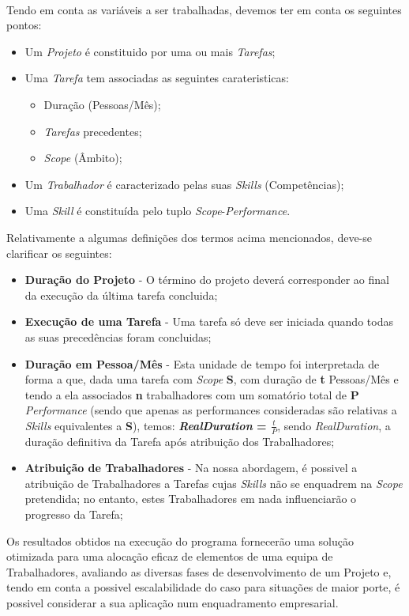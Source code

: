 \documentclass[a4paper]{article}
\begin{document}
\paragraph{}
Tendo em conta as variáveis a ser trabalhadas, devemos ter em conta os seguintes pontos:
\begin{itemize}
	\item Um \textit{Projeto} é constituido por uma ou mais \textit{Tarefas};
	\item Uma \textit{Tarefa} tem associadas as seguintes carateristicas:
	\begin{itemize}
		\item Duração (Pessoas/Mês);
		\item \textit{Tarefas} precedentes;
		\item \textit{Scope} (Âmbito);
	\end{itemize}
	\item Um \textit{Trabalhador} é caracterizado pelas suas \textit{Skills} (Competências);
	\item Uma \textit{Skill} é constituída pelo tuplo \textit{Scope}-\textit{Performance}.
\end{itemize}

Relativamente a algumas definições dos termos acima mencionados, deve-se clarificar os seguintes:
\begin{itemize}
	\item \textbf{Duração do Projeto} - O término do projeto deverá corresponder ao final da execução da última tarefa concluida;
	\item \textbf{Execução de uma Tarefa} - Uma tarefa só deve ser iniciada quando todas as suas precedências foram concluidas;
	\item \textbf{Duração em Pessoa/Mês} - Esta unidade de tempo foi interpretada de forma a que, dada uma tarefa com \textit{Scope} \textbf{S}, com duração de \textbf{t} Pessoas/Mês e tendo a ela associados \textbf{n} trabalhadores com um somatório total de \textbf{P} \textit{Performance} (sendo que apenas as performances consideradas são relativas a \textit{Skills} equivalentes a \textbf{S}), temos: \textbf{\textit{RealDuration} = $\frac{t}{P}$}, sendo \textit{RealDuration}, a duração definitiva da Tarefa após atribuição dos Trabalhadores;
	\item \textbf{Atribuição de Trabalhadores} - Na nossa abordagem, é possivel a atribuição de Trabalhadores a Tarefas cujas \textit{Skills} não se enquadrem na \textit{Scope} pretendida; no entanto, estes Trabalhadores em nada influenciarão o progresso da Tarefa;
\end{itemize}
Os resultados obtidos na execução do programa fornecerão uma solução otimizada para uma alocação eficaz de elementos de uma equipa de Trabalhadores, avaliando as diversas fases de desenvolvimento de um Projeto e, tendo em conta a possivel escalabilidade do caso para situações de maior porte, é possivel considerar a sua aplicação num enquadramento empresarial.
\newpage
\end{document}
